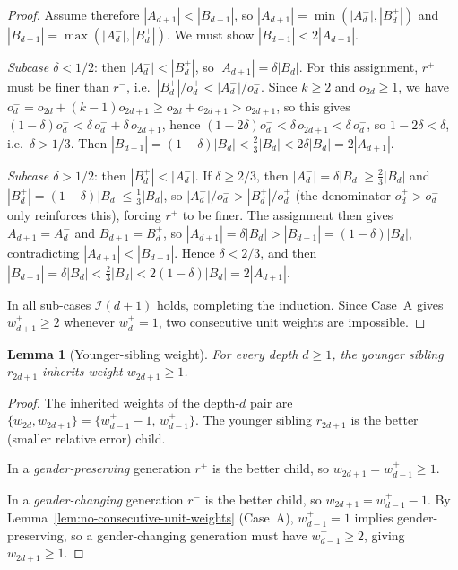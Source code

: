 \documentclass[12pt]{article}
\newtheorem{lemma}[theorem]{Lemma}
\theoremstyle{definition}
\theoremstyle{remark}
\theoremstyle{plain}
\begin{document}
\begin{proof}
Assume therefore $|A_{d+1}| < |B_{d+1}|$, so
$|A_{d+1}| = \min(|A^-_d|,|B^+_d|)$ and $|B_{d+1}| = \max(|A^-_d|,|B^+_d|)$.
We must show $|B_{d+1}| < 2|A_{d+1}|$.

\emph{Subcase $\delta < 1/2$}: then $|A^-_d| < |B^+_d|$, so
$|A_{d+1}| = \delta|B_d|$.  For this assignment, $r^+$ must be finer than $r^-$,
i.e.\ $|B^+_d|/o^+_d < |A^-_d|/o^-_d$.  Since $k \geq 2$ and $o_{2d} \geq 1$,
we have $o^-_d = o_{2d} + (k-1)o_{2d+1} \geq o_{2d} + o_{2d+1} > o_{2d+1}$,
so this gives $(1-\delta)o^-_d < \delta\,o^-_d + \delta\,o_{2d+1}$,
hence $(1-2\delta)o^-_d < \delta\,o_{2d+1} < \delta\,o^-_d$,
so $1 - 2\delta < \delta$, i.e.\ $\delta > 1/3$.
Then $|B_{d+1}| = (1-\delta)|B_d| < \tfrac{2}{3}|B_d| < 2\delta|B_d| = 2|A_{d+1}|$.

\emph{Subcase $\delta > 1/2$}: then $|B^+_d| < |A^-_d|$.
If $\delta \geq 2/3$, then $|A^-_d| = \delta|B_d| \geq \tfrac{2}{3}|B_d|$
and $|B^+_d| = (1-\delta)|B_d| \leq \tfrac{1}{3}|B_d|$, so $|A^-_d|/o^-_d > |B^+_d|/o^+_d$
(the denominator $o^+_d > o^-_d$ only reinforces this), forcing $r^+$ to be finer.
The assignment then gives $A_{d+1} = A^-_d$ and $B_{d+1} = B^+_d$, so
$|A_{d+1}| = \delta|B_d| > |B_{d+1}| = (1-\delta)|B_d|$, contradicting
$|A_{d+1}| < |B_{d+1}|$.  Hence $\delta < 2/3$, and then
$|B_{d+1}| = \delta|B_d| < \tfrac{2}{3}|B_d| < 2(1-\delta)|B_d| = 2|A_{d+1}|$.

In all sub-cases $\mathcal{I}(d+1)$ holds, completing the induction.
Since Case~A gives $w^+_{d+1} \geq 2$ whenever $w^+_d = 1$, two consecutive
unit weights are impossible.
\end{proof}

\begin{lemma}[Younger-sibling weight]
\label{lem:younger-sibling-weight}
For every depth $d \geq 1$, the younger sibling $r_{2d+1}$ inherits weight
$w_{2d+1} \geq 1$.
\end{lemma}

\begin{proof}
The inherited weights of the depth-$d$ pair are $\{w_{2d}, w_{2d+1}\} = \{w^+_{d-1}-1,\, w^+_{d-1}\}$.
The younger sibling $r_{2d+1}$ is the better (smaller relative error) child.

In a \emph{gender-preserving} generation $r^+$ is the better child, so
$w_{2d+1} = w^+_{d-1} \geq 1$.

In a \emph{gender-changing} generation $r^-$ is the better child, so
$w_{2d+1} = w^+_{d-1} - 1$.
By Lemma~\ref{lem:no-consecutive-unit-weights} (Case~A), $w^+_{d-1} = 1$ implies
gender-preserving, so a gender-changing generation must have $w^+_{d-1} \geq 2$,
giving $w_{2d+1} \geq 1$.
\end{proof}
\end{document}
